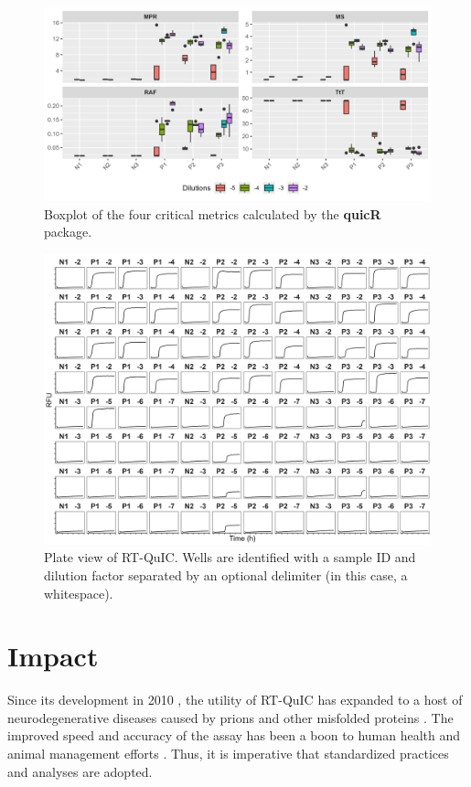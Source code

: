 \documentclass[preprint,12pt,a4paper]{elsarticle}
\begin{document}
\begin{figure}[ht]
\centering
\includegraphics[width=\textwidth]{images/boxplot.png}
\caption{Boxplot of the four critical metrics calculated by the \textbf{quicR} package.}
\label{fig:boxplot}
\end{figure}

\begin{figure}[ht]
\centering
\includegraphics[width=\textwidth]{images/plate_view.png}
\caption{Plate view of RT-QuIC. Wells are identified with a sample ID and dilution factor separated by an optional delimiter (in this case, a whitespace).}
\label{fig:plateview}
\end{figure}

\section{Impact}
Since its development in 2010 \cite{Wilham2010,Atarashi2011}, the utility of RT-QuIC has expanded to a host of neurodegenerative diseases caused by prions and other misfolded proteins \cite{Orru2024,ALWAKIL202597,Wang2024}. The improved speed and accuracy of the assay has been a boon to human health \cite{Orru2015,green2019rt,race2019transmission,vascellari2022real} and animal management efforts \cite{huang2025chronic,cooper2019detection,piel2024validation,harpaz2024transmission}. Thus, it is imperative that standardized practices and analyses are adopted.
\end{document}
